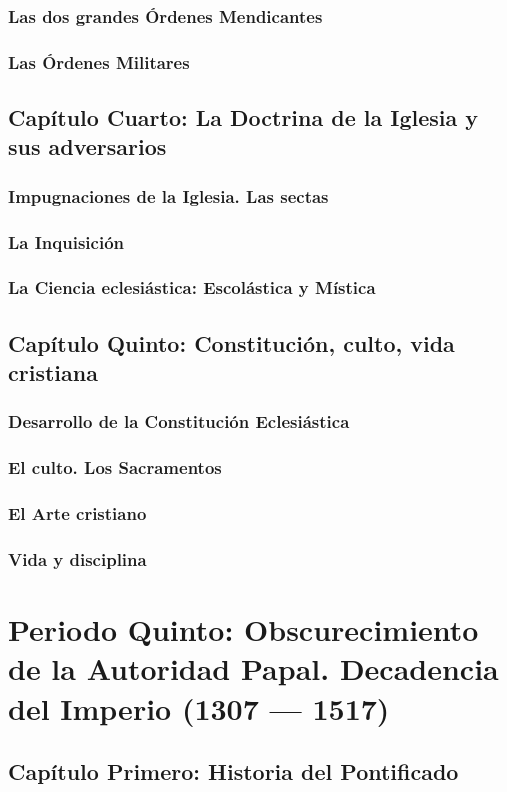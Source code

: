 \raggedbottom{} \documentclass[12pt, a4paper, openany]{book} %
\begin{document}
\section{Las dos grandes Órdenes Mendicantes}
\section{Las Órdenes Militares}
\chapter{Capítulo Cuarto: La Doctrina de la Iglesia y sus adversarios}
\section{Impugnaciones de la Iglesia. Las sectas}
\section{La Inquisición}
\section{La Ciencia eclesiástica: Escolástica y Mística}
\chapter{Capítulo Quinto: Constitución, culto, vida cristiana}
\section{Desarrollo de la Constitución Eclesiástica}
\section{El culto. Los Sacramentos}
\section{El Arte cristiano}
\section{Vida y disciplina}
\part{Periodo Quinto: Obscurecimiento de la Autoridad Papal. Decadencia del Imperio (1307 --- 1517)}
\chapter{Capítulo Primero: Historia del Pontificado}
\end{document}
